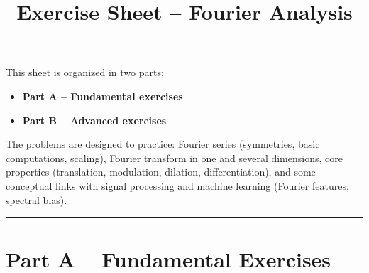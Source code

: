 \documentclass[11pt]{article}
\title{Exercise Sheet -- Fourier Analysis}
\author{}
\date{}
\begin{document}
\maketitle

This sheet is organized in two parts:
\begin{itemize}
  \item \textbf{Part A -- Fundamental exercises}
  \item \textbf{Part B -- Advanced exercises}
\end{itemize}

The problems are designed to practice: Fourier series (symmetries, basic computations, scaling), Fourier transform in one and several dimensions, core properties (translation, modulation, dilation, differentiation), and some conceptual links with signal processing and machine learning (Fourier features, spectral bias).


\bigskip
\hrule
\bigskip

\section*{Part A -- Fundamental Exercises}
\end{document}
